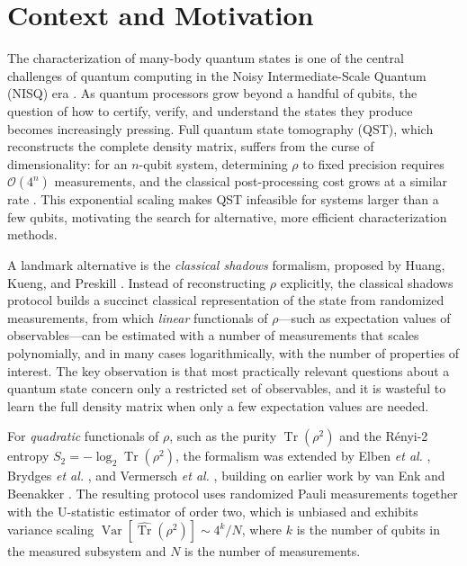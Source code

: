 \documentclass[12pt,a4paper,oneside]{book}
\theoremstyle{plain}
\theoremstyle{definition}
\theoremstyle{remark}
\DeclareMathOperator{\Var}{Var}
\begin{document}
\section{Context and Motivation}
\label{sec:context}

The characterization of many-body quantum states is one of the central challenges of quantum computing in the Noisy Intermediate-Scale Quantum (NISQ) era \cite{preskill2018quantum}. As quantum processors grow beyond a handful of qubits, the question of how to certify, verify, and understand the states they produce becomes increasingly pressing. Full quantum state tomography (QST), which reconstructs the complete density matrix, suffers from the curse of dimensionality: for an $n$-qubit system, determining $\rho$ to fixed precision requires $\mathcal{O}(4^n)$ measurements, and the classical post-processing cost grows at a similar rate \cite{gross2010compressed, nielsen2010quantum}. This exponential scaling makes QST infeasible for systems larger than a few qubits, motivating the search for alternative, more efficient characterization methods.

A landmark alternative is the \emph{classical shadows} formalism, proposed by Huang, Kueng, and Preskill \cite{huang2020predicting}. Instead of reconstructing $\rho$ explicitly, the classical shadows protocol builds a succinct classical representation of the state from randomized measurements, from which \emph{linear} functionals of $\rho$---such as expectation values of observables---can be estimated with a number of measurements that scales polynomially, and in many cases logarithmically, with the number of properties of interest. The key observation is that most practically relevant questions about a quantum state concern only a restricted set of observables, and it is wasteful to learn the full density matrix when only a few expectation values are needed.

For \emph{quadratic} functionals of $\rho$, such as the purity $\operatorname{Tr}(\rho^2)$ and the R\'enyi-2 entropy $S_2 = -\log_2 \operatorname{Tr}(\rho^2)$, the formalism was extended by Elben \textit{et al.} \cite{elben2020cross}, Brydges \textit{et al.} \cite{brydges2019probing}, and Vermersch \textit{et al.} \cite{vermersch2018statistical}, building on earlier work by van Enk and Beenakker \cite{vanenk2012measuring}. The resulting protocol uses randomized Pauli measurements together with the U-statistic estimator of order two, which is unbiased and exhibits variance scaling $\Var[\widehat{\operatorname{Tr}}(\rho^2)] \sim 4^k / N$, where $k$ is the number of qubits in the measured subsystem and $N$ is the number of measurements.
\end{document}
